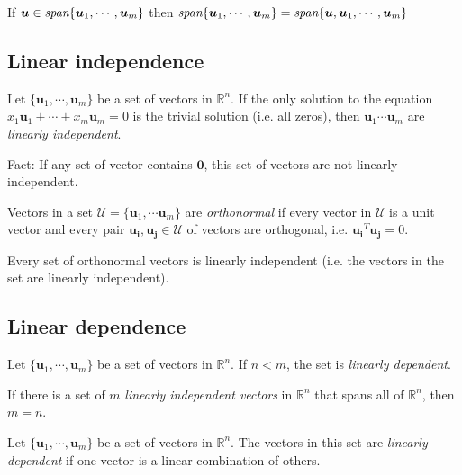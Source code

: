 \begin{theorem}
If $\bm{u}\in\emph{span}\{\bm{u}_1,\cdots,\bm{u}_m\}$ then $\emph{span}\{\bm{u}_1,\cdots,\bm{u}_m\}=\emph{span}\{\bm{u},\bm{u}_1,\cdots,\bm{u}_m\}$ 
\end{theorem}

\subsection{Linear independence}
\begin{definition}
Let $\{\bm{u}_1,\cdots,\bm{u}_m\}$ be a set of vectors in $\mathbb{R}^n$. If the only solution to the equation $x_1\bm{u}_1+\cdots+x_m\bm{u}_m=0$ is the trivial solution (i.e. all zeros), then $\bm{u}_1\cdots\bm{u}_m$ are \emph{linearly independent}.
\end{definition}
Fact: If any set of vector contains $\bm{0}$, this set of vectors are not linearly independent.

\begin{definition}
Vectors in a set $\mathcal{U}=\{\bm{u}_1,\cdots\bm{u}_m\}$ are \emph{orthonormal} if every vector in $\mathcal{U}$ is a unit vector and every pair $\bm{u_i},\bm{u_j}\in\mathcal{U}$ of vectors are orthogonal, i.e. $\bm{u_i}^T\bm{u_j}=0$.
\end{definition}

\begin{theorem}
Every set of orthonormal vectors is linearly independent (i.e. the vectors in the set are linearly independent).
\end{theorem}

\subsection{Linear dependence}
\begin{theorem}
Let $\{\bm{u}_1,\cdots,\bm{u}_m\}$ be a set of vectors in $\mathbb{R}^n$. If $n<m$, the set is \emph{linearly dependent}.
\end{theorem}

\begin{corollary}
If there is a set of $m$ \emph{linearly independent vectors} in $\mathbb{R}^n$ that spans all of $\mathbb{R}^n$, then $m=n$.
\end{corollary}

\begin{theorem}
Let $\{\bm{u}_1,\cdots,\bm{u}_m\}$ be a set of vectors in $\mathbb{R}^n$. The vectors in this set are \emph{linearly dependent} if one vector is a linear combination of others.
\end{theorem}

